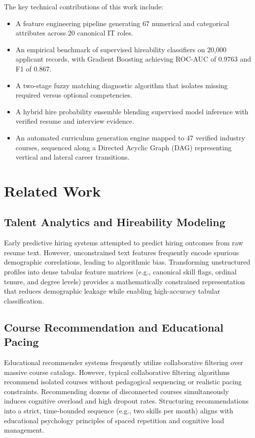 \documentclass[conference]{IEEEtran}
\begin{document}
The key technical contributions of this work include:
\begin{itemize}
    \item A feature engineering pipeline generating 67 numerical and categorical attributes across 20 canonical IT roles.
    \item An empirical benchmark of supervised hireability classifiers on 20,000 applicant records, with Gradient Boosting achieving ROC-AUC of 0.9763 and F1 of 0.867.
    \item A two-stage fuzzy matching diagnostic algorithm that isolates missing required versus optional competencies.
    \item A hybrid hire probability ensemble blending supervised model inference with verified resume and interview evidence.
    \item An automated curriculum generation engine mapped to 47 verified industry courses, sequenced along a Directed Acyclic Graph (DAG) representing vertical and lateral career transitions.
\end{itemize}

\section{Related Work}

\subsection{Talent Analytics and Hireability Modeling}
Early predictive hiring systems attempted to predict hiring outcomes from raw resume text. However, unconstrained text features frequently encode spurious demographic correlations, leading to algorithmic bias. Transforming unstructured profiles into dense tabular feature matrices (e.g., canonical skill flags, ordinal tenure, and degree levels) provides a mathematically constrained representation that reduces demographic leakage while enabling high-accuracy tabular classification.

\subsection{Course Recommendation and Educational Pacing}
Educational recommender systems frequently utilize collaborative filtering over massive course catalogs. However, typical collaborative filtering algorithms recommend isolated courses without pedagogical sequencing or realistic pacing constraints. Recommending dozens of disconnected courses simultaneously induces cognitive overload and high dropout rates. Structuring recommendations into a strict, time-bounded sequence (e.g., two skills per month) aligns with educational psychology principles of spaced repetition and cognitive load management.
\end{document}
